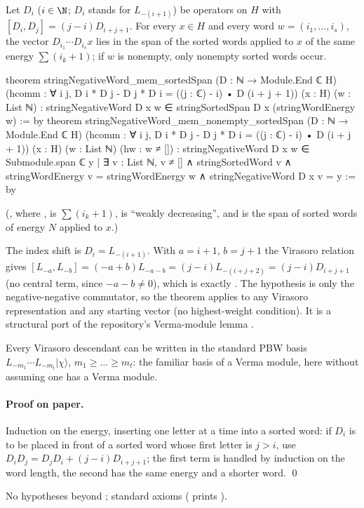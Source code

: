 \begin{theorem}[Straightening]\label{ch18:thm:straightening}
Let $D_i$ ($i\in\N$; $D_i$ stands for $L_{-(i+1)}$) be operators on $H$ with
$[D_i,D_j]=(j-i)D_{i+j+1}$.  For every $x\in H$ and every word $w=(i_1,\dots,i_s)$, the vector
$D_{i_1}\cdots D_{i_s}x$ lies in the span of the sorted words applied to $x$ of the same energy
$\sum(i_k+1)$; if $w$ is nonempty, only nonempty sorted words occur.
\end{theorem}
\begin{leancode}
theorem stringNegativeWord_mem_sortedSpan (D : ℕ → Module.End ℂ H)
    (hcomm : ∀ i j, D i * D j - D j * D i = ((j : ℂ) - i) • D (i + j + 1))
    (x : H) (w : List ℕ) :
    stringNegativeWord D x w ∈ stringSortedSpan D x (stringWordEnergy w) := by
theorem stringNegativeWord_mem_nonempty_sortedSpan (D : ℕ → Module.End ℂ H)
    (hcomm : ∀ i j, D i * D j - D j * D i = ((j : ℂ) - i) • D (i + j + 1))
    (x : H) (w : List ℕ) (hw : w ≠ []) :
    stringNegativeWord D x w ∈ Submodule.span ℂ {y | ∃ v : List ℕ,
      v ≠ [] ∧ stringSortedWord v ∧ stringWordEnergy v = stringWordEnergy w ∧
        stringNegativeWord D x v = y} := by
\end{leancode}
(, where
,  is
$\sum(i_k+1)$,  is ``weakly decreasing'', and  is
the span of sorted words of energy $N$ applied to $x$.)
\begin{dictionary}
The index shift is $D_i=L_{-(i+1)}$.  With $a=i+1$, $b=j+1$ the Virasoro relation gives
$[L_{-a},L_{-b}]=(-a+b)L_{-a-b}=(j-i)L_{-(i+j+2)}=(j-i)D_{i+j+1}$ (no central term, since $-a-b\neq0$),
which is exactly .  The hypothesis is only the negative-negative commutator, so the theorem applies to any
Virasoro representation and any starting vector (no highest-weight condition).  It is a structural port
of the repository's Verma-module lemma .
\end{dictionary}
\begin{physics}
Every Virasoro descendant can be written in the standard PBW basis $L_{-m_1}\cdots L_{-m_t}|\chi\rangle$,
$m_1\ge\dots\ge m_t$: the familiar basis of a Verma module, here without assuming one has a Verma module.
\end{physics}
\paragraph{Proof on paper.}  Induction on the energy, inserting one letter at a time into a sorted word:
if $D_i$ is to be placed in front of a sorted word whose first letter is $j>i$, use
$D_iD_j=D_jD_i+(j-i)D_{i+j+1}$; the first term is handled by induction on the word length, the second has
the same energy and a shorter word. \qed
\begin{status}No hypotheses beyond ; standard axioms ( prints
).\end{status}

